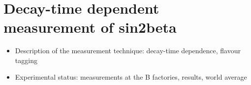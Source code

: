 \section{Decay-time dependent measurement of sin2beta}
\begin{itemize}
  \item Description of the measurement technique: decay-time dependence, flavour tagging
  \item Experimental status: measurements at the B factories, results, world average
\end{itemize}
